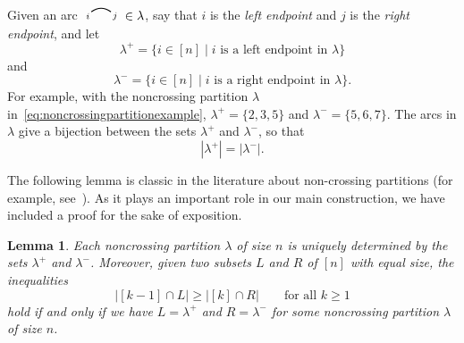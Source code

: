 \documentclass[12pt]{amsart}
\newtheorem{lem}[equation]{Lemma}
\theoremstyle{definition}
\theoremstyle{remark}
\numberwithin{equation}{section}
\newcommand{\edge}[2]{\tikz[scale = 0.75, baseline = -0.2cm]{
\draw (0.1, 0) node[inner sep = 0ex] (a) {};
\node[left, xshift = 0.1cm, yshift = -0.1cm] at (a) {$\scriptstyle #1$};
\draw (0.9, 0)  node[inner sep = 0ex] (b) {};
\node[right, xshift = -0.1cm, yshift = -0.1cm] at (b) {$\scriptstyle #2$};
\draw[thick] (a) to[out = 35, in = 145] (b);}}
\begin{document}
Given an arc $ \edge{i}{j} \in \lambda$, say that $i$ is the \emph{left endpoint} and $j$ is the \emph{right endpoint}, and let
\[
\lambda^{+} = \{ i \in [n] \;|\; \text{$i$ is a left endpoint in $\lambda$} \}
\]
and
\[
\lambda^{-} = \{ i \in [n] \;|\; \text{$i$ is a right endpoint in $\lambda$} \}.
\]
For example, with the noncrossing partition $\lambda$ in~\eqref{eq:noncrossingpartitionexample}, $\lambda^{+} = \{2, 3, 5\}$ and $\lambda^{-} = \{5, 6, 7\}$.  The arcs in $\lambda$ give a bijection between the sets $\lambda^{+}$ and $\lambda^{-}$, so that
\[
|\lambda^{+}| = |\lambda^{-}|.
\]

The following lemma is classic in the literature about non-crossing partitions (for example, see~\cite{Stanley}). 
As it plays an important role in our main construction, we have included a proof for the sake of exposition.
\begin{lem}
\label{lem:noncrossingpartitionproperty}
Each noncrossing partition $\lambda$ of size $n$ is uniquely determined by the sets $\lambda^{+}$ and $\lambda^{-}$.  Moreover, given two subsets $L$ and $R$ of $[n]$ with equal size, the inequalities
\[
\big|[k-1] \cap L\big| \ge \big|[k] \cap R\big| \qquad\text{for all $k \ge 1$}
\]
hold if and only if we have $L = \lambda^{+}$ and $R = \lambda^{-}$ for some noncrossing partition $\lambda$ of size $n$.
\end{lem}
\end{document}
